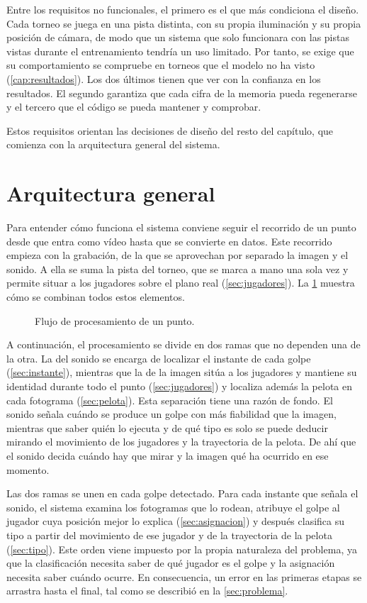 Entre los requisitos no funcionales, el primero es el que más condiciona el diseño.
Cada torneo se juega en una pista distinta, con su propia iluminación y su propia posición de cámara, de modo que un sistema que solo funcionara con las pistas vistas durante el entrenamiento tendría un uso limitado.
Por tanto, se exige que su comportamiento se compruebe en torneos que el modelo no ha visto (\cref{cap:resultados}).
Los dos últimos tienen que ver con la confianza en los resultados.
El segundo garantiza que cada cifra de la memoria pueda regenerarse y el tercero que el código se pueda mantener y comprobar.

Estos requisitos orientan las decisiones de diseño del resto del capítulo, que comienza con la arquitectura general del sistema.

\section{Arquitectura general}
\label{sec:arquitectura}

Para entender cómo funciona el sistema conviene seguir el recorrido de un punto desde que entra como vídeo hasta que se convierte en datos.
Este recorrido empieza con la grabación, de la que se aprovechan por separado la imagen y el sonido.
A ella se suma la pista del torneo, que se marca a mano una sola vez y permite situar a los jugadores sobre el plano real (\cref{sec:jugadores}).
La \cref{fig:flujo} muestra cómo se combinan todos estos elementos.

\begin{figure}[htbp]
  \centering
  
  \caption{Flujo de procesamiento de un punto.}
  \label{fig:flujo}
\end{figure}

A continuación, el procesamiento se divide en dos ramas que no dependen una de la otra.
La del sonido se encarga de localizar el instante de cada golpe (\cref{sec:instante}), mientras que la de la imagen sitúa a los jugadores y mantiene su identidad durante todo el punto (\cref{sec:jugadores}) y localiza además la pelota en cada fotograma (\cref{sec:pelota}).
Esta separación tiene una razón de fondo.
El sonido señala cuándo se produce un golpe con más fiabilidad que la imagen, mientras que saber quién lo ejecuta y de qué tipo es solo se puede deducir mirando el movimiento de los jugadores y la trayectoria de la pelota.
De ahí que el sonido decida cuándo hay que mirar y la imagen qué ha ocurrido en ese momento.

Las dos ramas se unen en cada golpe detectado.
Para cada instante que señala el sonido, el sistema examina los fotogramas que lo rodean, atribuye el golpe al jugador cuya posición mejor lo explica (\cref{sec:asignacion}) y después clasifica su tipo a partir del movimiento de ese jugador y de la trayectoria de la pelota (\cref{sec:tipo}).
Este orden viene impuesto por la propia naturaleza del problema, ya que la clasificación necesita saber de qué jugador es el golpe y la asignación necesita saber cuándo ocurre.
En consecuencia, un error en las primeras etapas se arrastra hasta el final, tal como se describió en la \cref{sec:problema}.

